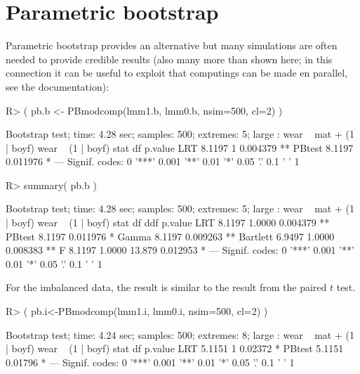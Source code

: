 \documentclass[11pt]{article}
\begin{document}
\section{Parametric bootstrap}
\label{sec:parametric-bootstrap}

Parametric bootstrap provides an alternative but many simulations are
often needed to provide credible results (also many more than shown
here; in this connection it can be useful to exploit that computings
can be made en parallel, see the documentation):

\begin{Schunk}
\begin{Sinput}
R> ( pb.b <- PBmodcomp(lmm1.b, lmm0.b, nsim=500, cl=2) )
\end{Sinput}
\begin{Soutput}
Bootstrap test; time: 4.28 sec; samples: 500; extremes: 5;
large : wear ~ mat + (1 | boyf)
wear ~ (1 | boyf)
         stat df  p.value   
LRT    8.1197  1 0.004379 **
PBtest 8.1197    0.011976 * 
---
Signif. codes:  0 '***' 0.001 '**' 0.01 '*' 0.05 '.' 0.1 ' ' 1
\end{Soutput}
\end{Schunk}

\begin{Schunk}
\begin{Sinput}
R> summary( pb.b )
\end{Sinput}
\begin{Soutput}
Bootstrap test; time: 4.28 sec; samples: 500; extremes: 5;
large : wear ~ mat + (1 | boyf)
wear ~ (1 | boyf)
           stat     df    ddf  p.value   
LRT      8.1197 1.0000        0.004379 **
PBtest   8.1197               0.011976 * 
Gamma    8.1197               0.009263 **
Bartlett 6.9497 1.0000        0.008383 **
F        8.1197 1.0000 13.879 0.012953 * 
---
Signif. codes:  0 '***' 0.001 '**' 0.01 '*' 0.05 '.' 0.1 ' ' 1
\end{Soutput}
\end{Schunk}


For the imbalanced data, the result is similar to the result from the
paired $t$ test.

\begin{Schunk}
\begin{Sinput}
R> ( pb.i<-PBmodcomp(lmm1.i, lmm0.i, nsim=500, cl=2) )
\end{Sinput}
\begin{Soutput}
Bootstrap test; time: 4.24 sec; samples: 500; extremes: 8;
large : wear ~ mat + (1 | boyf)
wear ~ (1 | boyf)
         stat df p.value  
LRT    5.1151  1 0.02372 *
PBtest 5.1151    0.01796 *
---
Signif. codes:  0 '***' 0.001 '**' 0.01 '*' 0.05 '.' 0.1 ' ' 1
\end{Soutput}
\end{Schunk}
\end{document}
